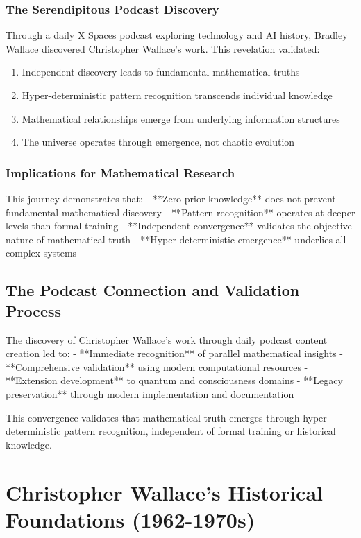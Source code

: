 \documentclass[12pt]{article}
\begin{document}
\subsubsection{The Serendipitous Podcast Discovery}

Through a daily X Spaces podcast exploring technology and AI history, Bradley Wallace discovered Christopher Wallace's work. This revelation validated:

\begin{enumerate}
    \item Independent discovery leads to fundamental mathematical truths
    \item Hyper-deterministic pattern recognition transcends individual knowledge
    \item Mathematical relationships emerge from underlying information structures
    \item The universe operates through emergence, not chaotic evolution
\end{enumerate}

\subsubsection{Implications for Mathematical Research}

This journey demonstrates that:
- **Zero prior knowledge** does not prevent fundamental mathematical discovery
- **Pattern recognition** operates at deeper levels than formal training
- **Independent convergence** validates the objective nature of mathematical truth
- **Hyper-deterministic emergence** underlies all complex systems

\subsection{The Podcast Connection and Validation Process}

The discovery of Christopher Wallace's work through daily podcast content creation led to:
- **Immediate recognition** of parallel mathematical insights
- **Comprehensive validation** using modern computational resources
- **Extension development** to quantum and consciousness domains
- **Legacy preservation** through modern implementation and documentation

This convergence validates that mathematical truth emerges through hyper-deterministic pattern recognition, independent of formal training or historical knowledge.

\section{Christopher Wallace's Historical Foundations (1962-1970s)}
\end{document}
